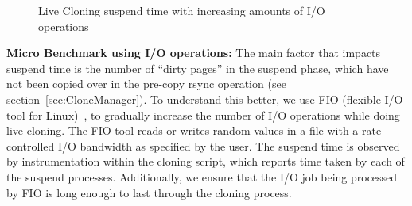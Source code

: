 \begin{figure}[ht]
  \centering
\begin{adjustbox}{max size={.45\textwidth}}
  \end{adjustbox}
  \caption{Live Cloning suspend time with increasing amounts of I/O operations }
  \label{fig:fioResults}
\end{figure}


\noindent
\textbf{Micro Benchmark using I/O operations:}
The main factor that impacts suspend time is the number of ``dirty pages'' in the suspend phase, which have not been copied over in the pre-copy rsync operation (see section~\ref{sec:CloneManager}).
To understand this better, we use FIO (flexible I/O tool for Linux)~\cite{fio}, to gradually increase the number of I/O operations while doing live cloning.
The FIO tool reads or writes random values in a file with a rate controlled I/O bandwidth as specified by the user. 
The suspend time is observed by instrumentation within the cloning script, which reports time taken by each of the suspend processes.
Additionally, we ensure that the I/O job being processed by FIO is long enough to last through the cloning process.

